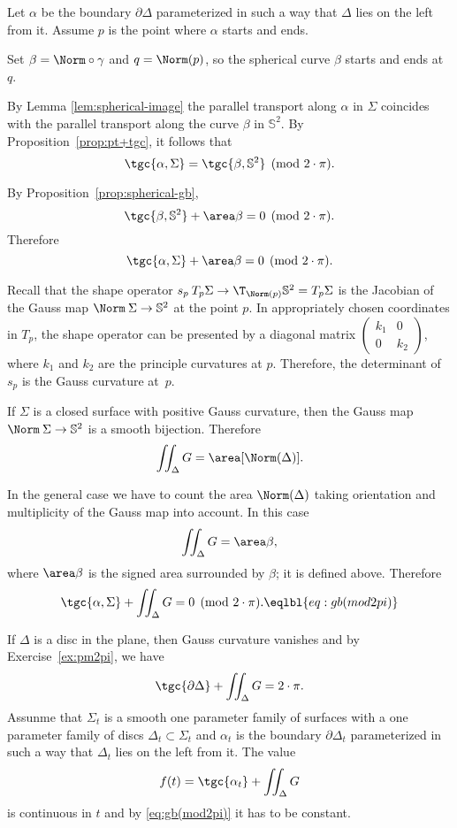 Let $\alpha$ be the boundary $\partial\Delta$ parameterized in such a way that $\Delta$ lies on the left from it.
Assume $p$ is the point where $\alpha$ starts and ends.

Set $\beta=\Norm\circ\gamma$ and $q=\Norm(p)$, so the spherical curve $\beta$ starts and ends at $q$.

By Lemma \ref{lem:spherical-image} the parallel transport along $\alpha$ in $\Sigma$ coincides with the parallel transport along the curve $\beta$ in $\mathbb{S}^2$.
By Proposition~\ref{prop:pt+tgc}, it follows that 
\[\tgc{\alpha,\Sigma}=\tgc{\beta,\mathbb{S}^2} \pmod{2\cdot \pi}.\]

By Proposition~\ref{prop:spherical-gb},
\[\tgc{\beta,\mathbb{S}^2}+\area\beta=0\pmod{2\cdot \pi}.\]
Therefore 
\[\tgc{\alpha,\Sigma}+\area\beta=0\pmod{2\cdot \pi}.\]

Recall that the shape  operator $s_p\: T_p\Sigma \to \T_{\Norm(p)}\mathbb{S}^2=T_p\Sigma$ is the Jacobian of the Gauss map $\Norm\:\Sigma\to \mathbb{S}^2$ at the point $p$.
In appropriately chosen coordinates in $T_p$, the shape operator can be presented by a diagonal matrix 
$\left(\begin{smallmatrix}
k_1&0
\\
0&k_2
\end{smallmatrix}\right)$, where $k_1$ and $k_2$ are the principle curvatures at $p$.
Therefore, the determinant of $s_p$ is the Gauss curvature at~$p$.

If $\Sigma$ is a closed surface with positive Gauss curvature, then the Gauss map $\Norm\:\Sigma\to\mathbb{S}^2$ is a smooth bijection.
Therefore 
\[\iint_\Delta G=\area[\Norm(\Delta)].\]

In the general case we have to count the area $\Norm(\Delta)$ taking orientation and multiplicity of the Gauss map into account.
In this case 
\[\iint_\Delta G=\area\beta,\]
where $\area\beta$ is the signed area surrounded by $\beta$; it is defined above.
Therefore 
\[\tgc{\alpha,\Sigma}+\iint_\Delta G=0\pmod{2\cdot \pi}.\eqlbl{eq:gb(mod2pi)}\]

If $\Delta$ is a disc in the plane, then Gauss curvature vanishes and by Exercise~\ref{ex:pm2pi}, we have 
\[\tgc{\partial\Delta}+\iint_\Delta G=2\cdot \pi.\]
Assunme that $\Sigma_t$ is a smooth one parameter family of surfaces with 
a one parameter family of discs $\Delta_t\subset \Sigma_t$ and $\alpha_t$ is the boundary $\partial\Delta_t$ parameterized in such a way that $\Delta_t$ lies on the left from it.
The value 
\[f(t)=\tgc{\alpha_t}+\iint_\Delta G\]
is continuous in $t$ and by \ref{eq:gb(mod2pi)} it has to be constant.

